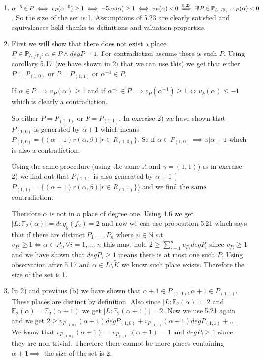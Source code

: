 \documentclass[12pt, a4paper]{article}
\begin{document}
\section{}
\begin{enumerate}[label=(\alph*)]
\item $\alpha^{-5} \in P \iff v_P(\alpha^{-5})\geq 1 \iff -5v_P(\alpha)\geq 1 \iff v_P(\alpha) < 0 \stackrel{\text{5.23}}{\implies} \\\exists! P \in \mathbb{P}_{L_1/\mathbb{F}_2} : v_P(\alpha)<0$. So the size of the set is 1. Assumptions of 5.23 are clearly satisfied and equivalences hold thanks to definitions and valuation properties.

\item First we will show that there does not exist a place $P \in \mathbb{P}_{L_1/\mathbb{F}_2}: \alpha \in P \land deg P = 1$. For contradiction assume there is such $P$. Using corollary 5.17 (we have shown in 2) that we can use this) we get that either $P = P_{(1,0)}$ or $P = P_{(1,1)}$ or $\alpha^{-1} \in P$. 

If $\alpha \in P \implies v_P(\alpha)\geq 1$ and if $\alpha^{-1} \in P \implies v_P(\alpha^{-1}) \geq 1 \iff v_P(\alpha) \leq -1$ which is clearly a contradiction. 

So either $P = P_{(1,0)}$ or $P = P_{(1,1)}$. In exercise 2) we have shown that $P_{(1,0)}$ is generated by $\alpha+1$ which means $P_{(1,0)}=\{(\alpha+1)r(\alpha,\beta)|r\in R_{(1,0)}\}$. So if $\alpha \in P_{(1,0)} \implies \alpha | \alpha + 1$ which is also a contradiction. 

Using the same procedure (using the same $A$ and $\gamma =(1,1)$) as in exercise 2) we find out that $P_{(1,1)}$ is also generated by $\alpha+1$ ($P_{(1,1)}=\{(\alpha+1)r(\alpha,\beta)|r\in R_{(1,1)}\}$) and we find the same contradiction.

Therefore $\alpha$ is not in a place of degree one. Using 4.6 we get $|L:\mathbb{F}_2(\alpha)|=deg_y(f_2)=2$ and now we can use proposition 5.21 which says that if there are distinct $P_1,\dots,P_n$ where $n\in \mathbb{N}$ s.t. $v_{P_i}\geq 1 \iff \alpha \in P_i, \forall i=1,\dots,n$ this must hold $2\geq \sum_{i=1}^n v_{P_i} deg P_i$ since $v_{P_i}\geq 1$ and we have shown that $degP_i \geq 1$ means there is at most one such $P$. Using observation after 5.17 and $\alpha \in L \setminus \tilde{K}$ we know such place exists. Therefore the size of the set is 1.

\item In 2) and previous (b) we have shown that $\alpha+1 \in P_{(1,0)}, \alpha+1 \in P_{(1,1)}$. These places are distinct by definition. Also since $|L:\mathbb{F}_2(\alpha)| = 2$ and $\mathbb{F}_2(\alpha) = \mathbb{F}_2(\alpha+1)$ we get $|L:\mathbb{F}_2(\alpha+1)| = 2$. Now we use 5.21 again and we get $2\geq v_{P_{(1,0)}}(\alpha+1)degP_{(1,0)} + v_{P_{(1,1)}}(\alpha+1)degP_{(1,1)} + \dots$. We know that $v_{P_{(1,0)}}(\alpha+1) = v_{P_{(1,1)}}(\alpha+1) = 1$ and $deg P_i \geq 1$ since they are non trivial. Therefore there cannot be more places containing $\alpha+1 \implies$ the size of the set is 2.


\end{enumerate}
\end{document}
